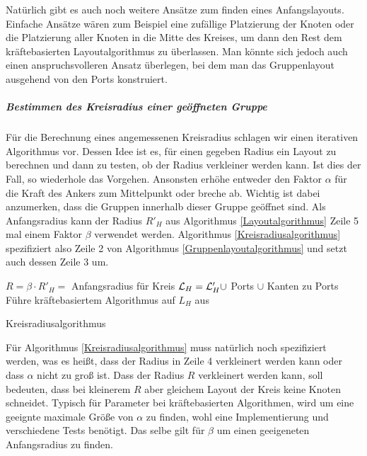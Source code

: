 Natürlich gibt es auch noch weitere Ansätze zum finden eines Anfangslayouts.
Einfache Ansätze wären zum Beispiel eine zufällige Platzierung der Knoten oder die Platzierung aller Knoten in die Mitte des Kreises, 
um dann den Rest dem kräftebasierten Layoutalgorithmus zu überlassen. 
Man könnte sich jedoch auch einen anspruchsvolleren Ansatz überlegen, bei dem man das Gruppenlayout ausgehend von den Ports konstruiert.


\subparagraph{Bestimmen des Kreisradius einer geöffneten Gruppe}
\label{Radius}

Für die Berechnung eines angemessenen Kreisradius schlagen wir einen iterativen Algorithmus vor. 
Dessen Idee ist es, für einen gegeben Radius ein Layout zu berechnen und dann zu testen, ob der Radius verkleiner werden kann. 
Ist dies der Fall, so wiederhole das Vorgehen. Ansonsten erhöhe entweder den Faktor $\alpha$ für die Kraft des Ankers zum Mittelpunkt oder breche ab. 
Wichtig ist dabei anzumerken, dass die Gruppen innerhalb dieser Gruppe geöffnet sind.
Als Anfangsradius kann der Radius $R'_H$ aus Algorithmus \ref{Layoutalgorithmus} Zeile 5 mal einem Faktor $\beta$ verwendet werden.
Algorithmus \ref{Kreisradiusalgorithmus} spezifiziert also Zeile 2 von Algorithmus  \ref{Gruppenlayoutalgorithmus} und setzt auch dessen Zeile 3 um.

\begin{algorithm}[H]
\label{Kreisradiusalgorithmus}
\SetAlgoLined
{}
$R = \beta \cdot R'_H = $ Anfangsradius für Kreis\;
$\mathcal{L}_H = \mathcal{L}'_H \cup$ Ports $\cup$  Kanten zu Ports\;
Führe kräftebasiertem Algorithmus auf  $L_H$ aus\;
\caption{Kreisradiusalgorithmus}
\end{algorithm}

Für Algorithmus \ref{Kreisradiusalgorithmus} muss natürlich noch spezifiziert werden, was es heißt, dass der Radius in Zeile 4 verkleinert werden kann
oder dass $\alpha$ nicht zu groß ist. 
Dass der Radius $R$ verkleinert werden kann, soll bedeuten, dass bei kleinerem $R$ aber gleichem Layout der Kreis keine Knoten schneidet. 
Typisch für Parameter bei kräftebasierten Algorithmen, wird um eine geeignte maximale Größe von $\alpha$ zu finden, wohl eine Implementierung und verschiedene Tests benötigt. 
Das selbe gilt für $\beta$ um einen geeigeneten Anfangsradius zu finden.

